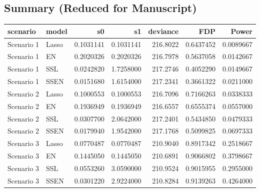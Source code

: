 \documentclass[
]{article}
\begin{document}
\hypertarget{summary-reduced-for-manuscript}{%
\subsection{Summary (Reduced for
Manuscript)}\label{summary-reduced-for-manuscript}}

\begin{longtable}[]{@{}llrrrrr@{}}
\toprule
scenario & model & s0 & s1 & deviance & FDP & Power \\
\midrule
\endhead
Scenario 1 & Lasso & 0.1031141 & 0.1031141 & 216.8022 & 0.6437452 &
0.0089667 \\
Scenario 1 & EN & 0.2020326 & 0.2020326 & 216.7978 & 0.5637058 &
0.0142667 \\
Scenario 1 & SSL & 0.0242820 & 1.7258000 & 217.2746 & 0.4052290 &
0.0149667 \\
Scenario 1 & SSEN & 0.0151680 & 1.6154000 & 217.2341 & 0.3661322 &
0.0211000 \\
Scenario 2 & Lasso & 0.1000553 & 0.1000553 & 216.7096 & 0.7166263 &
0.0338333 \\
Scenario 2 & EN & 0.1936949 & 0.1936949 & 216.6557 & 0.6555374 &
0.0557000 \\
Scenario 2 & SSL & 0.0307700 & 2.0642000 & 217.2401 & 0.5434850 &
0.0479333 \\
Scenario 2 & SSEN & 0.0179940 & 1.9542000 & 217.1768 & 0.5099825 &
0.0697333 \\
Scenario 3 & Lasso & 0.0770487 & 0.0770487 & 210.9040 & 0.8917342 &
0.2518667 \\
Scenario 3 & EN & 0.1445050 & 0.1445050 & 210.6891 & 0.9066802 &
0.3798667 \\
Scenario 3 & SSL & 0.0553260 & 3.0590000 & 210.9524 & 0.9015955 &
0.2955000 \\
Scenario 3 & SSEN & 0.0301220 & 2.9224000 & 210.8284 & 0.9139263 &
0.4264000 \\
\bottomrule
\end{longtable}
\end{document}
